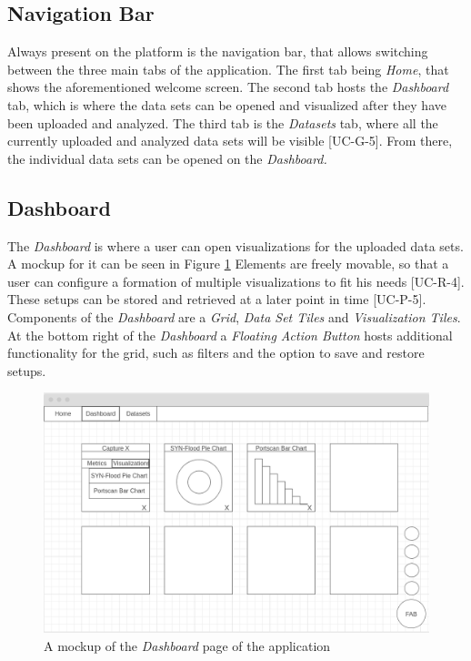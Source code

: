 \subsection{Navigation Bar}
Always present on the platform is the navigation bar, that allows switching between the three main tabs of the application. The first tab being \emph{Home}, that shows the aforementioned welcome screen. The second tab hosts the \emph{Dashboard} tab, which is where the data sets can be opened and visualized after they have been uploaded and analyzed. The third tab is the \emph{Datasets} tab, where all the currently uploaded and analyzed data sets will be visible [UC-G-5]. From there, the individual data sets can be opened on the \emph{Dashboard.}

\subsection{Dashboard}
The \emph{Dashboard} is where a user can open visualizations for the uploaded data sets. A mockup for it can be seen in Figure \ref{fig:dashboardmockup}  Elements are freely movable, so that a user can configure a formation of multiple visualizations to fit his needs [UC-R-4]. These setups can be stored and retrieved at a later point in time [UC-P-5]. Components of the \emph{Dashboard} are a \emph{Grid}, \emph{Data Set Tiles} and \emph{Visualization Tiles}. At the bottom right of the \emph{Dashboard} a \emph{Floating Action Button} hosts additional functionality for the grid, such as filters and the option to save and restore setups.

\begin{figure}
    \centering
    \includegraphics[width=16cm]{images/dashboard_mockup.png}
    \caption{A mockup of the \emph{Dashboard} page of the application}
    \label{fig:dashboardmockup}
\end{figure}

